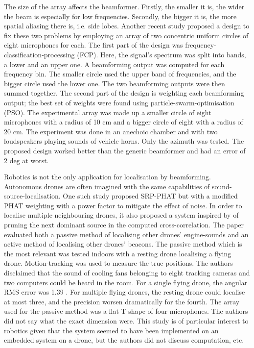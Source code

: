 \documentclass{report}
\begin{document}
The size of the array affects the beamformer. Firstly, the smaller it is, the wider the beam is especially for low frequencies. Secondly, the bigger it is, the more spatial aliasing there is, i.e. side lobes. Another recent study \cite{zhang_improved_2021} proposed a design to fix these two problems by employing an array of two concentric uniform circles of eight microphones for each. The first part of the design was frequency-classification-processing (FCP). Here, the signal's spectrum was split into bands, a lower and an upper one. A beamforming output was computed for each frequency bin. The smaller circle used the upper band of frequencies, and the bigger circle used the lower one. The two beamforming outputs were then summed together. The second part of the design is weighting each beamforming output; the best set of weights were found using particle-swarm-optimisation (PSO). The experimental array was made up a smaller circle of eight microphones with a radius of 10 \si{cm} and a bigger circle of eight with a radius of 20 \si{cm}. The experiment was done in an anechoic chamber and with two loudspeakers playing sounds of vehicle horns. Only the azimuth was tested. The proposed design worked better than the generic beamformer and had an error of 2 \si{deg} at worst.

Robotics is not the only application for localisation by beamforming. Autonomous drones are often imagined with the same capabilities of sound-source-localisation. One such study \cite{basiri_-board_2016} proposed SRP-PHAT but with a modified PHAT weighting with a power factor to mitigate the effect of noise. In order to localise multiple neighbouring drones, it also proposed a system inspired by \cite{brutti_multiple_2010} of pruning the next dominant source in the computed cross-correlation. The paper evaluated both a passive method of localising other drones' engine-sounds and an active method of localising other drones' beacons. The passive method which is the most relevant was tested indoors with a resting drone localising a flying drone. Motion-tracking was used to measure the true positions. The authors disclaimed that the sound of cooling fans belonging to eight tracking cameras and two computers could be heard in the room. For a single flying drone, the angular RMS error was 1.39 \si{\deg}. For multiple flying drones, the resting drone could localise at most three, and the precision worsen dramatically for the fourth. The array used for the passive method was a flat T-shape of four microphones. The authors did not say what the exact dimension were. This study is of particular interest to robotics given that the system seemed to have been implemented on an embedded system on a drone, but the authors did not discuss computation, etc.
\end{document}
